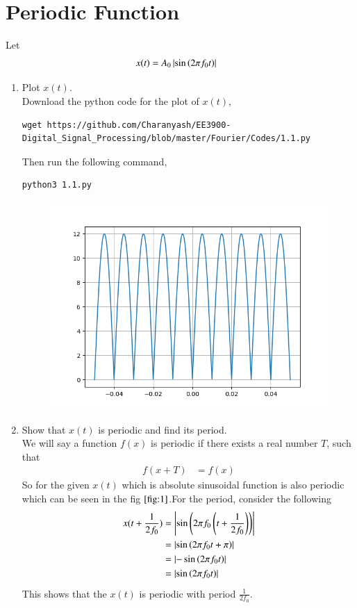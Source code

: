 \documentclass[journal,12pt,twocolumn]{IEEEtran}
\renewcommand\thesection{\arabic{section}}
\begin{document}
\section{Periodic Function}
Let
\begin{align}
	x(t) &= A_0\left\vert\sin\left(2\pi f_0 t\right)\right\vert
	\label{eq:10-orig-diff-def}
\end{align}
\begin{enumerate}[label=\thesection.\arabic*
,ref=\thesection.\theenumi]
\item Plot $x(t)$. \\
 \solution Download the python code for the plot of $x(t)$,
  \begin{lstlisting}
wget https://github.com/Charanyash/EE3900-Digital_Signal_Processing/blob/master/Fourier/Codes/1.1.py
   \end{lstlisting}
Then run the following command,
 \begin{lstlisting}
python3 1.1.py
\end{lstlisting}
 \begin{figure}
	 \centering
	 \includegraphics[width = \columnwidth]{Figs/1.1.png}
	 \caption{}
	 \label{fig:1}
 \end{figure}
\item Show that $x(t)$ is periodic and find its period. \\
 \solution We will say a function $f(x)$ is periodic if there exists a real number $T$, such that
  \begin{align}
	  f(x + T) &= f(x)
  \end{align}
  So for the given $x(t)$ which is absolute sinusoidal function is also periodic which can be seen in the fig $\ref{fig:1}$.For the period, consider the following 
   \begin{align}
	   x(t + \frac{1}{2f_0}) &= \left\vert\sin\left(2\pi f_0 \left(t + \frac{1}{2f_0}\right)\right)\right\vert \\
	                         &= \left\vert\sin\left(2\pi f_0t + \pi\right)\right\vert \\
				 &= \left\vert-\sin\left(2\pi f_0 t\right)\right\vert \\
				 &= \left\vert\sin\left(2\pi f_0 t\right)\right\vert
   \end{align}
This shows that the $x(t)$ is periodic with period $\frac{1}{2f_0}$.
\end{enumerate}
\end{document}
